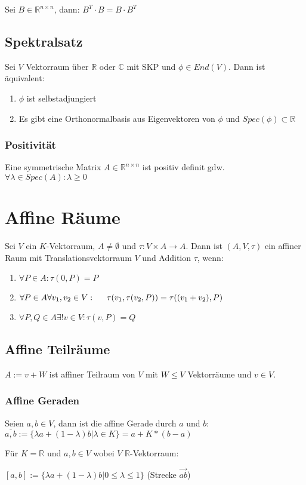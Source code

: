 Sei $B \in \mathbb{R}^{n\times n}$, dann: $B^T \cdot B = B \cdot B^T$

\subsection*{Spektralsatz}

Sei $V$ Vektorraum über $\mathbb{R}$ oder $\mathbb{C}$ mit SKP und $\phi \in End(V)$. Dann ist äquivalent:

\begin{enumerate}[label=(\alph*)]
	\item $\phi$ ist selbstadjungiert
	\item Es gibt eine Orthonormalbasis aus Eigenvektoren von $\phi$ und $Spec(\phi) \subset \mathbb{R}$
\end{enumerate}

\subsubsection*{Positivität}

Eine symmetrische Matrix $A \in \mathbb{R}^{n \times n}$ ist positiv definit gdw. $\forall \lambda \in Spec(A) : \lambda \geq 0$

\section*{Affine Räume}

Sei $V$ ein $K$-Vektorraum, $A \neq \emptyset$ und $\tau : V \times A \rightarrow A$. Dann ist $(A, V, \tau)$ ein affiner Raum  mit Translationsvektorraum $V$ und Addition $\tau$, wenn:

\begin{enumerate}[label=(\alph*)]
	\item $\forall P \in A : \tau(0, P) = P$
	\item $\forall P \in A \forall v_1, v_2 \in V : \\ \hspace*{5mm} \tau(v_1, \tau(v_2, P)) = \tau((v_1 + v_2), P)$
	\item $\forall P, Q \in A \exists ! v \in V : \tau(v, P) = Q$
\end{enumerate}

\subsection*{Affine Teilräume}

$A := v + W$ ist affiner Teilraum von $V$ mit $W \leq V$ Vektorräume und $v \in V$.

\subsubsection*{Affine Geraden}

Seien $a, b \in V$, dann ist die affine Gerade durch $a$ und $b$: $\overline{a, b} := \{\lambda a + (1 - \lambda)b | \lambda \in K\} = a + K*(b-a)$

Für $K = \mathbb{R}$ und $a, b \in V$ wobei $V$ $\mathbb{R}$-Vektorraum:

$[a, b] := \{\lambda a + (1 - \lambda)b|0 \leq \lambda \leq 1\}$ (Strecke $\overrightarrow{ab}$)
